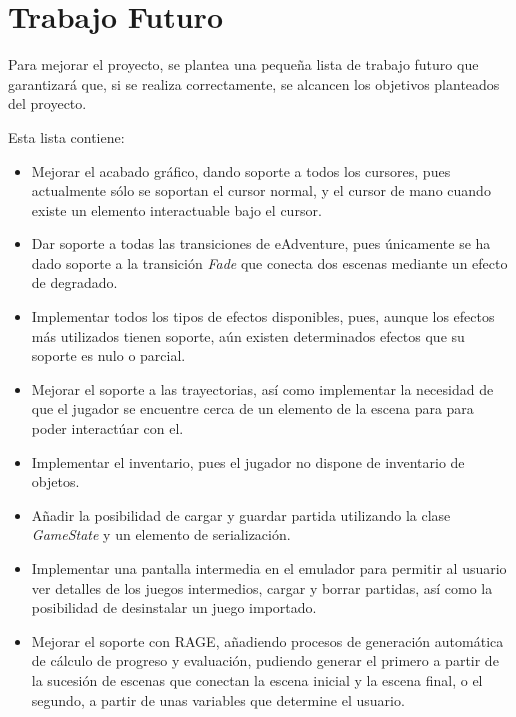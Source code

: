 \chapter{Trabajo Futuro}

Para mejorar el proyecto, se plantea una pequeña lista de trabajo futuro que garantizará que, si se realiza correctamente, se alcancen los objetivos planteados del proyecto.

Esta lista contiene:
\begin{itemize}
	\item Mejorar el acabado gráfico, dando soporte a todos los cursores, pues actualmente sólo se soportan el cursor normal, y el cursor de mano cuando existe un elemento interactuable bajo el cursor.
	
	\item Dar soporte a todas las transiciones de eAdventure, pues únicamente se ha dado soporte a la transición \textit{Fade} que conecta dos escenas mediante un efecto de degradado.
	
	\item Implementar todos los tipos de efectos disponibles, pues, aunque los efectos más utilizados tienen soporte, aún existen determinados efectos que su soporte es nulo o parcial.
	
	\item Mejorar el soporte a las trayectorias, así como implementar la necesidad de que el jugador se encuentre cerca de un elemento de la escena para para poder interactúar con el.
	
	\item Implementar el inventario, pues el jugador no dispone de inventario de objetos.
	
	\item Añadir la posibilidad de cargar y guardar partida utilizando la clase \textit{GameState} y un elemento de serialización.
	
	\item Implementar una pantalla intermedia en el emulador para permitir al usuario ver detalles de los juegos intermedios, cargar y borrar partidas, así como la posibilidad de desinstalar un juego importado.
	
	\item Mejorar el soporte con RAGE, añadiendo procesos de generación automática de cálculo de progreso y evaluación, pudiendo generar el primero a partir de la sucesión de escenas que conectan la escena inicial y la escena final, o el segundo, a partir de unas variables que determine el usuario.
	

\end{itemize}
